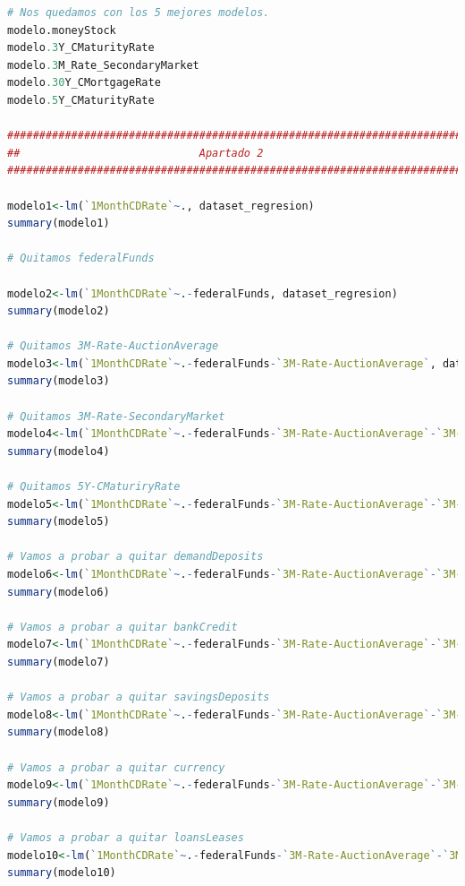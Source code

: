 \documentclass[12pt,a4paper]{article}
\begin{document}
\begin{lstlisting}[basicstyle=\tiny, language=R]
# Nos quedamos con los 5 mejores modelos.
modelo.moneyStock
modelo.3Y_CMaturityRate
modelo.3M_Rate_SecondaryMarket
modelo.30Y_CMortgageRate
modelo.5Y_CMaturityRate

###########################################################################
##                            Apartado 2                                 ##
###########################################################################

modelo1<-lm(`1MonthCDRate`~., dataset_regresion)
summary(modelo1)

# Quitamos federalFunds

modelo2<-lm(`1MonthCDRate`~.-federalFunds, dataset_regresion)
summary(modelo2)

# Quitamos 3M-Rate-AuctionAverage
modelo3<-lm(`1MonthCDRate`~.-federalFunds-`3M-Rate-AuctionAverage`, dataset_regresion)
summary(modelo3)

# Quitamos 3M-Rate-SecondaryMarket
modelo4<-lm(`1MonthCDRate`~.-federalFunds-`3M-Rate-AuctionAverage`-`3M-Rate-SecondaryMarket`, dataset_regresion)
summary(modelo4)

# Quitamos 5Y-CMaturiryRate
modelo5<-lm(`1MonthCDRate`~.-federalFunds-`3M-Rate-AuctionAverage`-`3M-Rate-SecondaryMarket`-`5Y-CMaturityRate`, dataset_regresion)
summary(modelo5)

# Vamos a probar a quitar demandDeposits
modelo6<-lm(`1MonthCDRate`~.-federalFunds-`3M-Rate-AuctionAverage`-`3M-Rate-SecondaryMarket`-`5Y-CMaturityRate`-demandDeposits, dataset_regresion)
summary(modelo6)

# Vamos a probar a quitar bankCredit
modelo7<-lm(`1MonthCDRate`~.-federalFunds-`3M-Rate-AuctionAverage`-`3M-Rate-SecondaryMarket`-`5Y-CMaturityRate`-demandDeposits-bankCredit, dataset_regresion)
summary(modelo7)

# Vamos a probar a quitar savingsDeposits
modelo8<-lm(`1MonthCDRate`~.-federalFunds-`3M-Rate-AuctionAverage`-`3M-Rate-SecondaryMarket`-`5Y-CMaturityRate`-demandDeposits-bankCredit-savingsDeposits, dataset_regresion)
summary(modelo8)

# Vamos a probar a quitar currency
modelo9<-lm(`1MonthCDRate`~.-federalFunds-`3M-Rate-AuctionAverage`-`3M-Rate-SecondaryMarket`-`5Y-CMaturityRate`-demandDeposits-bankCredit-savingsDeposits-currency, dataset_regresion)
summary(modelo9)

# Vamos a probar a quitar loansLeases
modelo10<-lm(`1MonthCDRate`~.-federalFunds-`3M-Rate-AuctionAverage`-`3M-Rate-SecondaryMarket`-`5Y-CMaturityRate`-demandDeposits-bankCredit-savingsDeposits-currency-loansLeases, dataset_regresion)
summary(modelo10)


\end{lstlisting}
\end{document}
